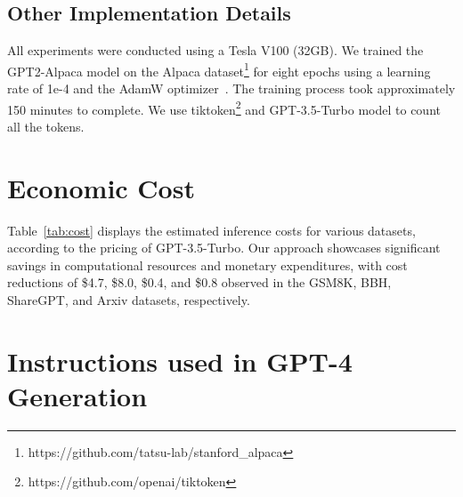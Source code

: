 \subsection{Other Implementation Details}
All experiments were conducted using a Tesla V100 (32GB). We trained the GPT2-Alpaca model on the Alpaca dataset\footnote{https://github.com/tatsu-lab/stanford\_alpaca} for eight epochs using a learning rate of 1e-4 and the AdamW optimizer~\cite{loshchilov2018decoupled}. The training process took approximately 150 minutes to complete.
We use tiktoken\footnote{https://github.com/openai/tiktoken} and GPT-3.5-Turbo model to count all the tokens.


\section{Economic Cost}


Table~\ref{tab:cost} displays the estimated inference costs for various datasets, according to the pricing of GPT-3.5-Turbo. Our approach showcases significant savings in computational resources and monetary expenditures, with cost reductions of \$4.7, \$8.0, \$0.4, and \$0.8 observed in the GSM8K, BBH, ShareGPT, and Arxiv datasets, respectively.


% 


\section{{Instructions used in GPT-4 Generation}}
\label{sec:gpt4_generation_instructions}

